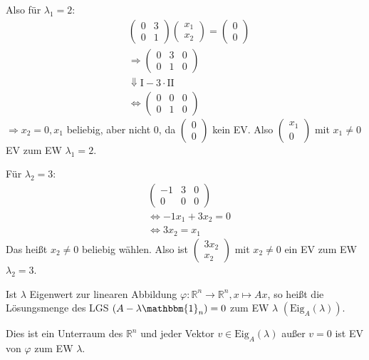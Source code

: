 Also für $\lambda_1 = 2$:
\begin{align*}
	&\begin{pmatrix}0 & 3 \\ 0 & 1\end{pmatrix}\begin{pmatrix}x_1 \\ x_2\end{pmatrix} = \begin{pmatrix}0\\0\end{pmatrix} \\
	&\Rightarrow \left(\begin{array}{cc|c}0 & 3 & 0 \\ 0 & 1 & 0\end{array}\right) \\
	&\Downarrow \text{I} - 3 \cdot \text{II} \\
	&\Leftrightarrow \left(\begin{array}{cc|c}0 & 0 & 0 \\ 0 & 1 & 0\end{array}\right)
\end{align*}
$\Rightarrow x_2 = 0, x_1$ beliebig, aber nicht $0$, da $\begin{pmatrix}0\\0\end{pmatrix}$ kein EV. Also $\begin{pmatrix}x_1\\0\end{pmatrix}$ mit $x_1 \neq 0$ EV zum EW $\lambda _1 = 2$.

Für $\lambda_2 = 3$:
\begin{align*}
	&\left(\begin{array}{cc|c}-1 & 3 & 0 \\ 0 & 0 & 0\end{array}\right) \\
	&\Leftrightarrow -1x_1 + 3x_2 = 0 \\
	&\Leftrightarrow 3x_2 = x_1
\end{align*}
Das heißt $x_2 \neq 0$ beliebig wählen. Also ist $\begin{pmatrix}3x_2\\x_2\end{pmatrix}$ mit $x_2 \neq 0$ ein EV zum EW $\lambda _2 = 3$.

Ist $\lambda$ Eigenwert zur linearen Abbildung $\varphi : \mathbb{R}^n \rightarrow \mathbb{R}^n, x \mapsto Ax$, so heißt die Lösungsmenge des LGS $(A - \lambda \mathbbm{1}_n) = 0$  zum EW $\lambda$ $(\text{Eig}_A(\lambda))$.

Dies ist ein Unterraum des $\mathbb{R}^n$ und jeder Vektor $v \in \text{Eig}_A(\lambda)$ außer $v = 0$ ist EV von $\varphi$ zum EW $\lambda$.





